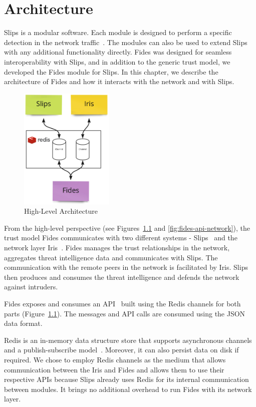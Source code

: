 \chapter{Architecture}
\label{ch:architecture}
Slips is a modular software. Each module is designed to perform a specific detection in the network traffic~\cite{slips}.
The modules can also be used to extend Slips with any additional functionality directly. 
Fides was designed for seamless interoperability with Slips, and in addition to the generic trust model, we developed the Fides module for Slips.
In this chapter, we describe the architecture of Fides and how it interacts with the network and with Slips.

\begin{figure}[ht]
    \centering
    \includegraphics[width=0.4\textwidth]{assets/redis_channels.jpeg}
    \caption{High-Level Architecture}
    \label{fig:high-level-architecture}
\end{figure}

From the high-level perspective (see Figures~\ref{fig:high-level-architecture} and \ref{fig:fides-api-network}), the trust model Fides  communicates with two different systems - Slips~\cite{slips} and the network layer Iris~\cite{nl}.
Fides manages the trust relationships in the network, aggregates threat intelligence data and communicates with Slips. The communication with the remote peers in the network is facilitated by Iris. 
Slips then produces and consumes the threat intelligence and defends the network against intruders.

Fides exposes and consumes an API~\cite{api} built using the Redis channels for both parts (Figure~\ref{fig:high-level-architecture}).
The messages and API calls are consumed using the JSON~\cite{json} data format.

Redis is an in-memory data structure store that supports asynchronous channels and a publish-subscribe model~\cite{redis}. Moreover, it can also persist data on disk if required.
We chose to employ Redis channels as the medium that allows communication between the Iris and Fides and allows them to use their respective APIs because Slips already uses Redis for its internal communication between modules. It brings no additional overhead to run Fides with its network layer.



